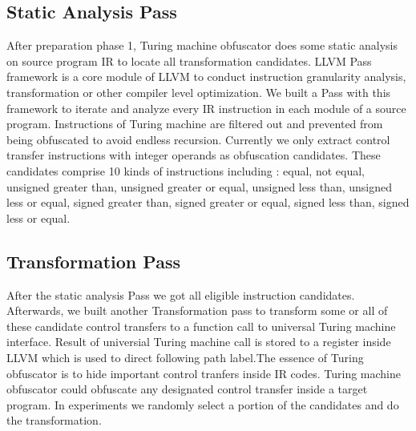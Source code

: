 \documentclass[lnicst]{svmultln}
\begin{document}
\subsection{Static Analysis Pass}
After preparation phase 1, Turing machine obfuscator does some static analysis on source program IR to locate all transformation candidates. LLVM Pass framework is a core module of LLVM to conduct instruction granularity analysis, transformation or other compiler level optimization.
We built a Pass with this framework to iterate and analyze every IR instruction in each module of a source program. Instructions of Turing machine are filtered out and prevented from being obfuscated to avoid endless recursion. Currently we only extract control transfer instructions with integer operands as obfuscation candidates. These candidates comprise 10 kinds of instructions including : equal, not equal, unsigned greater than, unsigned greater or equal,  unsigned less than, unsigned less or equal, signed greater than, signed greater or equal, signed less than, signed less or equal. 
\subsection{Transformation Pass}
After the static analysis Pass we got all eligible instruction candidates. Afterwards, we built another Transformation pass to transform some or all of these candidate control transfers to a function call to universal Turing machine interface. Result of universial Turing machine call is stored to a register inside LLVM which is used to direct following path label.The essence of Turing obfuscator is to hide important control tranfers inside IR codes. Turing machine obfuscator could obfuscate any designated control transfer inside a target program. In experiments we randomly select a portion of the candidates and do the transformation.
\end{document}
